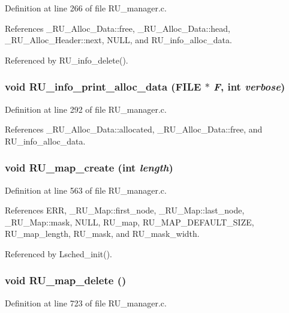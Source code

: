 Definition at line 266 of file RU\_\-manager.c.

References \_\-RU\_\-Alloc\_\-Data::free, \_\-RU\_\-Alloc\_\-Data::head, \_\-RU\_\-Alloc\_\-Header::next, NULL, and RU\_\-info\_\-alloc\_\-data.

Referenced by RU\_\-info\_\-delete().
\subsubsection{\setlength{\rightskip}{0pt plus 5cm}void RU\_\-info\_\-print\_\-alloc\_\-data (FILE $\ast$ {\em F}, int {\em verbose})}\label{RU__manager_8c_e39d950d620a4bfdd3872cc8d122995d}




Definition at line 292 of file RU\_\-manager.c.

References \_\-RU\_\-Alloc\_\-Data::allocated, \_\-RU\_\-Alloc\_\-Data::free, and RU\_\-info\_\-alloc\_\-data.
\subsubsection{\setlength{\rightskip}{0pt plus 5cm}void RU\_\-map\_\-create (int {\em length})}\label{RU__manager_8c_8ee2628e7e9d01b3fd92ba1863a997c6}




Definition at line 563 of file RU\_\-manager.c.

References ERR, \_\-RU\_\-Map::first\_\-node, \_\-RU\_\-Map::last\_\-node, \_\-RU\_\-Map::mask, NULL, RU\_\-map, RU\_\-MAP\_\-DEFAULT\_\-SIZE, RU\_\-map\_\-length, RU\_\-mask, and RU\_\-mask\_\-width.

Referenced by Lsched\_\-init().
\subsubsection{\setlength{\rightskip}{0pt plus 5cm}void RU\_\-map\_\-delete ()}\label{RU__manager_8c_d1c9b9ac585b8b3b21b3333341b3ea64}




Definition at line 723 of file RU\_\-manager.c.

